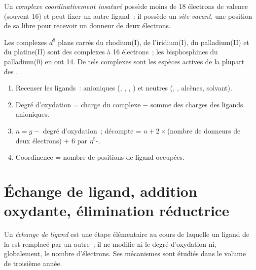 \begin{definition}\label{def:b2:catalytic-cycles:unsaturated}
Un \emph{complexe coordinativement insaturé}
possède moins de 18 électrons de valence (souvent 16) et peut fixer un autre ligand~: il possède un
\emph{site vacant}, une position de sa  libre pour
recevoir un donneur de deux électrons.
\end{definition}

Les complexes $d^8$ plans carrés du rhodium(I), de l'iridium(I), du palladium(II) et du
platine(II) sont des complexes à 16 électrons~; les bisphosphines du palladium(0)  en ont 14.
De tels complexes sont les espèces actives de la plupart des .

\begin{method}\label{met:b2:catalytic-cycles:count-organometallic}
\begin{enumerate}
  \item Recenser les ligands~: anioniques (, , , ) et neutres
        (, , alcènes, solvant).
  \item Degré d'oxydation = charge du complexe $-$ somme des charges des ligands anioniques.
  \item $n = g -$ degré d'oxydation~; décompte = $n + 2 \times$(nombre de donneurs de deux électrons)
        $+$ 6 par $\eta^5$-.
  \item Coordinence = nombre de positions de ligand occupées.
\end{enumerate}
\end{method}

\section{Échange de ligand, addition oxydante, élimination réductrice}

\begin{definition}\label{def:b2:catalytic-cycles:ligand-exchange}
Un \emph{échange de ligand} est une étape élémentaire au cours de laquelle un ligand de
la  est remplacé par un autre~; il ne modifie ni le degré d'oxydation
ni, globalement, le nombre d'électrons. Ses mécanismes sont étudiés dans le volume de troisième année.
\end{definition}

